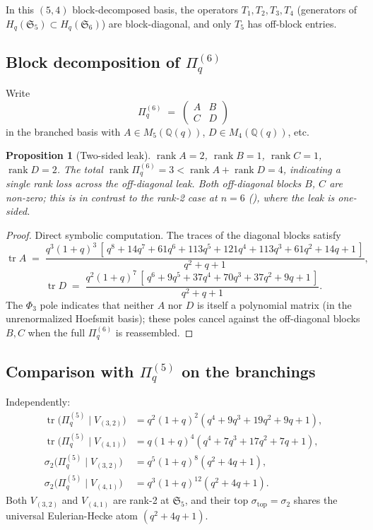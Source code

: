 \documentclass[11pt]{article}
\theoremstyle{plain}
\newtheorem{proposition}[theorem]{Proposition}
\theoremstyle{definition}
\theoremstyle{remark}
\newcommand{\Q}{\mathbb{Q}}
\newcommand{\Sym}{\mathfrak{S}}
\newcommand{\Hq}{H_q}
\newcommand{\Pibs}{\Pi_q}
\newcommand{\trace}{\operatorname{tr}}
\newcommand{\rank}{\operatorname{rank}}
\begin{document}
In this $(5,4)$ block-decomposed basis, the operators $T_1, T_2, T_3, T_4$
(generators of $\Hq(\Sym_5) \subset \Hq(\Sym_6)$) are block-diagonal,
and only $T_5$ has off-block entries.

\subsection{Block decomposition of $\Pibs^{(6)}$}

Write
\[
\Pibs^{(6)} \;=\; \begin{pmatrix} A & B \\ C & D \end{pmatrix}
\]
in the branched basis with $A \in M_5(\Q(q))$, $D \in M_4(\Q(q))$, etc.

\begin{proposition}[Two-sided leak]\label{prop:leak}
$\rank A = 2$, $\rank B = 1$, $\rank C = 1$, $\rank D = 2$. The total
$\rank \Pibs^{(6)} = 3 < \rank A + \rank D = 4$, indicating a single rank
loss across the off-diagonal leak. Both off-diagonal blocks $B$, $C$ are
non-zero; this is in contrast to the rank-2 case at $n=6$
(\cite{2026-04-25-rank1-leak-sigma2-n6}), where the leak is one-sided.
\end{proposition}

\begin{proof}
Direct symbolic computation. The traces of the diagonal blocks satisfy
\[
\trace A \;=\; \frac{q^3 (1+q)^3 \, [\,q^8 + 14q^7 + 61q^6 + 113q^5 + 121q^4 + 113q^3 + 61q^2 + 14q + 1\,]}{q^2 + q + 1},
\]
\[
\trace D \;=\; \frac{q^2 (1+q)^7 \, [\,q^6 + 9q^5 + 37q^4 + 70q^3 + 37q^2 + 9q + 1\,]}{q^2 + q + 1}.
\]
The $\Phi_3$ pole indicates that neither $A$ nor $D$ is itself a polynomial
matrix (in the unrenormalized Hoefsmit basis); these poles cancel against
the off-diagonal blocks $B, C$ when the full $\Pibs^{(6)}$ is reassembled.
\end{proof}

\subsection{Comparison with $\Pibs^{(5)}$ on the branchings}

Independently:
\begin{align*}
\trace\bigl(\Pibs^{(5)} \mid V_{(3,2)}\bigr) &= q^2 (1+q)^2 (q^4 + 9q^3 + 19q^2 + 9q + 1),\\
\trace\bigl(\Pibs^{(5)} \mid V_{(4,1)}\bigr) &= q   (1+q)^4 (q^4 + 7q^3 + 17q^2 + 7q + 1),\\
\sigma_2\bigl(\Pibs^{(5)} \mid V_{(3,2)}\bigr) &= q^5 (1+q)^8  (q^2 + 4q + 1),\\
\sigma_2\bigl(\Pibs^{(5)} \mid V_{(4,1)}\bigr) &= q^3 (1+q)^{12}(q^2 + 4q + 1).
\end{align*}
Both $V_{(3,2)}$ and $V_{(4,1)}$ are rank-2 at $\Sym_5$, and their top
$\sigma_{\text{top}} = \sigma_2$ shares the universal Eulerian-Hecke atom
$(q^2+4q+1)$.
\end{document}
